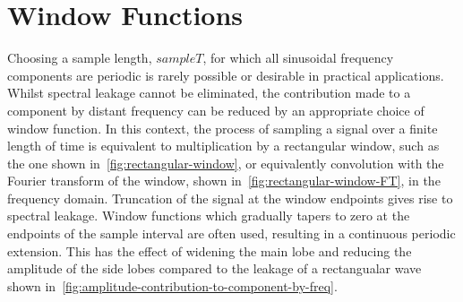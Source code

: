 \section{Window Functions}
Choosing a sample length, $sampleT$, for which all sinusoidal frequency
components are periodic is rarely possible or desirable in practical
applications. Whilst spectral leakage cannot be eliminated, the contribution
made to a component by distant frequency can be reduced by an appropriate choice
of window function. In this context, the process of sampling a signal over a
finite length of time is equivalent to multiplication by a rectangular window,
such as the one shown in~\ref{fig:rectangular-window}, or equivalently convolution with the Fourier transform of the window, shown in~\ref{fig:rectangular-window-FT}, in the frequency domain.
Truncation of the signal at the window endpoints gives rise to spectral leakage.
Window functions which gradually tapers to zero at the endpoints of the sample
interval are often used, resulting in a continuous periodic extension. This has
the effect of widening the main lobe and reducing the amplitude of the side
lobes compared to the leakage of a rectangualar wave shown
in~\ref{fig:amplitude-contribution-to-component-by-freq}.

